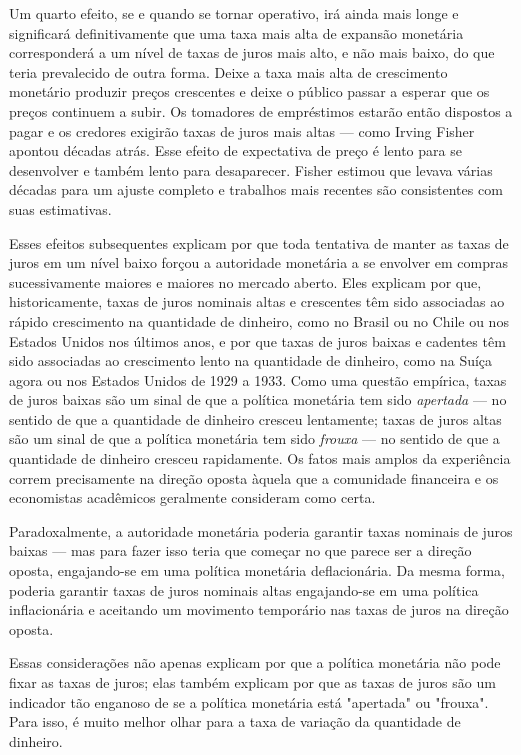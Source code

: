\documentclass[12pt]{article}
\begin{document}
Um quarto efeito, se e quando se tornar operativo, irá ainda mais longe e significará definitivamente que uma taxa mais alta de expansão monetária corresponderá a um nível de taxas de juros mais alto, e não mais baixo, do que teria prevalecido de outra forma. Deixe a taxa mais alta de crescimento monetário produzir preços crescentes e deixe o público passar a esperar que os preços continuem a subir. Os tomadores de empréstimos estarão então dispostos a pagar e os credores exigirão taxas de juros mais altas — como Irving Fisher apontou décadas atrás. Esse efeito de expectativa de preço é lento para se desenvolver e também lento para desaparecer. Fisher estimou que levava várias décadas para um ajuste completo e trabalhos mais recentes são consistentes com suas estimativas.

Esses efeitos subsequentes explicam por que toda tentativa de manter as taxas de juros em um nível baixo forçou a autoridade monetária a se envolver em compras sucessivamente maiores e maiores no mercado aberto. Eles explicam por que, historicamente, taxas de juros nominais altas e crescentes têm sido associadas ao rápido crescimento na quantidade de dinheiro, como no Brasil ou no Chile ou nos Estados Unidos nos últimos anos, e por que taxas de juros baixas e cadentes têm sido associadas ao crescimento lento na quantidade de dinheiro, como na Suíça agora ou nos Estados Unidos de 1929 a 1933. Como uma questão empírica, taxas de juros baixas são um sinal de que a política monetária tem sido \textit{apertada} — no sentido de que a quantidade de dinheiro cresceu lentamente; taxas de juros altas são um sinal de que a política monetária tem sido \textit{frouxa} — no sentido de que a quantidade de dinheiro cresceu rapidamente. Os fatos mais amplos da experiência correm precisamente na direção oposta àquela que a comunidade financeira e os economistas acadêmicos geralmente consideram como certa.

Paradoxalmente, a autoridade monetária poderia garantir taxas nominais de juros baixas — mas para fazer isso teria que começar no que parece ser a direção oposta, engajando-se em uma política monetária deflacionária. Da mesma forma, poderia garantir taxas de juros nominais altas engajando-se em uma política inflacionária e aceitando um movimento temporário nas taxas de juros na direção oposta.

Essas considerações não apenas explicam por que a política monetária não pode fixar as taxas de juros; elas também explicam por que as taxas de juros são um indicador tão enganoso de se a política monetária está "apertada" ou "frouxa". Para isso, é muito melhor olhar para a taxa de variação da quantidade de dinheiro.
\end{document}
